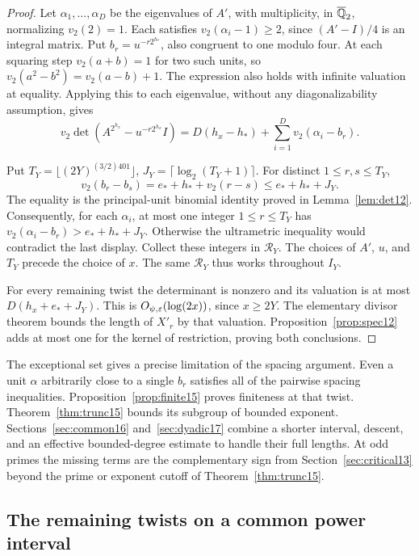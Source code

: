 \documentclass[a4paper,11pt]{article}
\theoremstyle{definition}
\theoremstyle{remark}
\numberwithin{equation}{section}
\begin{document}
\begin{proof}
Let \(\alpha_1,\ldots,\alpha_D\) be the eigenvalues of \(A'\), with multiplicity, in \(\overline{\mathbb Q}_2\), normalizing \(v_2(2)=1\). Each satisfies \(v_2(\alpha_i-1)\ge2\), since \((A'-I)/4\) is an integral matrix. Put \(b_r=u^{-r2^{h_*}}\), also congruent to one modulo four. At each squaring step \(v_2(a+b)=1\) for two such units, so \(v_2(a^2-b^2)=v_2(a-b)+1\). The expression also holds with infinite valuation at equality. Applying this to each eigenvalue, without any diagonalizability assumption, gives
\[
 v_2\!\det\!\left(A^{2^{h_x}}-u^{-r2^{h_x}}I\right)
       = D(h_x-h_*)+\sum_{i=1}^D v_2(\alpha_i-b_r).
\]

Put \(T_Y=\lfloor(2Y)^{(3/2)401}\rfloor\), \(J_Y=\lceil\log_2(T_Y+1)\rceil\).
For distinct \(1\le r,s\le T_Y\),
\[
  v_2(b_r-b_s)= e_*+h_*+v_2(r-s)
                         \le e_*+h_*+J_Y .
\]
The equality is the principal-unit binomial identity proved in Lemma~\ref{lem:det12}. Consequently, for each \(\alpha_i\), at most one integer \(1\le r\le T_Y\) has \(v_2(\alpha_i-b_r)>e_*+h_*+J_Y\). Otherwise the ultrametric inequality would contradict the last display. Collect these integers in \(\mathcal R_Y\). The choices of \(A'\), \(u\), and \(T_Y\) precede the choice of \(x\). The same \(\mathcal R_Y\) thus works throughout \(I_Y\).

For every remaining twist the determinant is nonzero and its valuation is at most \(D(h_x+e_*+J_Y)\). This is \(O_{\psi,\varepsilon}(\log(2x))\), since \(x\ge2Y\). The elementary divisor theorem bounds the length of \(X'_r\) by that valuation. Proposition~\ref{prop:spec12} adds at most one for the kernel of restriction, proving both conclusions.
\end{proof}

The exceptional set gives a precise limitation of the spacing argument. Even a unit \(\alpha\) arbitrarily close to a single \(b_r\) satisfies all of the pairwise spacing inequalities. Proposition~\ref{prop:finite15} proves finiteness at that twist. Theorem~\ref{thm:trunc15} bounds its subgroup of bounded exponent. Sections~\ref{sec:common16} and~\ref{sec:dyadic17} combine a shorter interval, descent, and an effective bounded-degree estimate to handle their full lengths. At odd primes the missing terms are the complementary sign from Section~\ref{sec:critical13} beyond the prime or exponent cutoff of Theorem~\ref{thm:trunc15}.

\subsection{The remaining twists on a common power interval}\label{nav:II-10}
\label{sec:common16}
\end{document}
